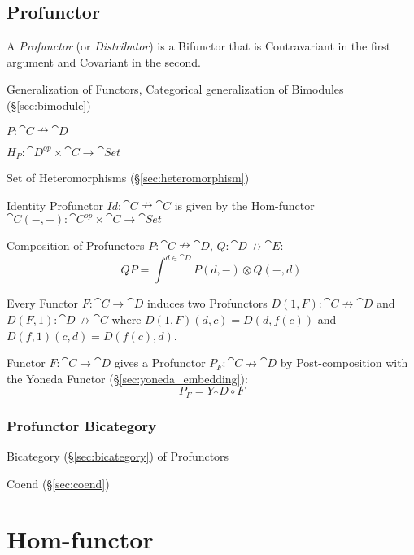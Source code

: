 \subsection{Profunctor}\label{sec:profunctor}

A \emph{Profunctor} (or \emph{Distributor}) is a Bifunctor that is
Contravariant in the first argument and Covariant in the second.

Generalization of Functors, Categorical generalization of Bimodules
(\S\ref{sec:bimodule})

$P : \cat{C} \nrightarrow \cat{D}$

$H_P : \cat{D}^{op} \times \cat{C} \rightarrow \cat{Set}$

Set of Heteromorphisms (\S\ref{sec:heteromorphism})

Identity Profunctor $Id : \cat{C} \nrightarrow \cat{C}$ is given by
the Hom-functor $\cat{C}(-,-) : \cat{C}^{op} \times \cat{C}
\rightarrow \cat{Set}$

Composition of Profunctors $P : \cat{C} \nrightarrow \cat{D}$, $Q :
\cat{D} \nrightarrow \cat{E}$:
\[
  Q P = \int^{d \in \cat{D}} P(d,-) \otimes Q(-,d)
\]

Every Functor $F : \cat{C} \rightarrow \cat{D}$ induces two
Profunctors $D(1,F) : \cat{C} \nrightarrow \cat{D}$ and $D(F,1)
: \cat{D} \nrightarrow \cat{C}$ where $D(1,F)(d,c) = D(d,f(c))$
and $D(f,1)(c,d) = D(f(c),d)$.

Functor $F : \cat{C} \rightarrow \cat{D}$ gives a Profunctor $P_F :
\cat{C} \nrightarrow \cat{D}$ by Post-composition with the Yoneda
Functor (\S\ref{sec:yoneda_embedding}):
\[
  P_F = Y_\cat{D} \circ F
\]



\subsubsection{Profunctor Bicategory}\label{sec:profunctor_bicategory}

Bicategory (\S\ref{sec:bicategory}) of Profunctors

Coend (\S\ref{sec:coend})



\section{Hom-functor}\label{sec:hom_functor}

